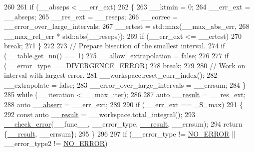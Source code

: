 \begin{DoxyCode}
260 
261           \textcolor{keywordflow}{if} (\_\_abseps < \_\_err\_ext)
262             \{
263               \_\_ktmin = 0;
264               \_\_err\_ext = \_\_abseps;
265               \_\_res\_ext = \_\_reseps;
266               \_\_correc = \_\_error\_over\_large\_intervals;
267               \_\_ertest = std::max(\_\_max\_abs\_err,
268                                   \_\_max\_rel\_err * std::abs(\_\_reseps));
269               \textcolor{keywordflow}{if} (\_\_err\_ext <= \_\_ertest)
270                 \textcolor{keywordflow}{break};
271             \}
272 
273           \textcolor{comment}{// Prepare bisection of the smallest interval.}
274           \textcolor{keywordflow}{if} (\_\_table.get\_nn() == 1)
275             \_\_allow\_extrapolation = \textcolor{keyword}{false};
276 
277           \textcolor{keywordflow}{if} (\_\_error\_type == \hyperlink{namespace____gnu__cxx_ad6c62dd86a596716cece6ac2d4cfd4b3a5a36b63b8fa7c921d9332c69416c2686}{DIVERGENCE\_ERROR})
278             \textcolor{keywordflow}{break};
279 
280           \textcolor{comment}{// Work on interval with largest error.}
281           \_\_workspace.reset\_curr\_index();
282           \_\_extrapolate = \textcolor{keyword}{false};
283           \_\_error\_over\_large\_intervals = \_\_errsum;
284         \}
285       \textcolor{keywordflow}{while} (\_\_iteration < \_\_max\_iter);
286 
287       \textcolor{keyword}{auto} \hyperlink{namespace____gnu__cxx_a500ea9f53aeaecd8c2ae657503450578}{\_\_result} = \_\_res\_ext;
288       \textcolor{keyword}{auto} \hyperlink{namespace____gnu__cxx_a72f736cff127f1574e91a301de9e074b}{\_\_abserr} = \_\_err\_ext;
289 
290       \textcolor{keywordflow}{if} (\_\_err\_ext == \_S\_max)
291         \{
292           \textcolor{keyword}{const} \textcolor{keyword}{auto} \hyperlink{namespace____gnu__cxx_a500ea9f53aeaecd8c2ae657503450578}{\_\_result} = \_\_workspace.total\_integral();
293           \hyperlink{namespace____gnu__cxx_a370fd142548c2e9e39e69282b4603317}{\_\_check\_error}(\_\_func\_\_, \_\_error\_type, \hyperlink{namespace____gnu__cxx_a500ea9f53aeaecd8c2ae657503450578}{\_\_result}, \_\_errsum);
294           \textcolor{keywordflow}{return} \{\hyperlink{namespace____gnu__cxx_a500ea9f53aeaecd8c2ae657503450578}{\_\_result}, \_\_errsum\};
295         \}
296 
297       \textcolor{keywordflow}{if} (\_\_error\_type != \hyperlink{namespace____gnu__cxx_ad6c62dd86a596716cece6ac2d4cfd4b3ac31eecc280b10dec2efb4a2216ccc2e0}{NO\_ERROR} || \_\_error\_type2 != \hyperlink{namespace____gnu__cxx_ad6c62dd86a596716cece6ac2d4cfd4b3ac31eecc280b10dec2efb4a2216ccc2e0}{NO\_ERROR})

\end{DoxyCode}

